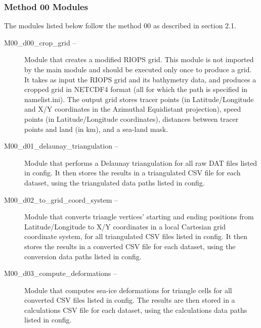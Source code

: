 \documentclass[draft]{agujournal2018}
\begin{document}
\subsubsection{Method 00 Modules}

The modules listed below follow the method 00 as described in section 2.1.

\begin{description}
  \item[M00\_d00\_crop\_grid --]
    Module that creates a modified RIOPS grid. This module is not imported by the main module and should be executed only once to produce a grid. It takes as input the RIOPS grid and its bathymetry data, and produces a cropped grid in NETCDF4 format (all for which the path is specified in namelist.ini). The output grid stores tracer points (in Latitude/Longitude and X/Y coordinates in the Azimuthal Equidistant projection), speed points (in Latitude/Longitude coordinates), distances between tracer points and land (in km), and a sea-land mask.

  \item[M00\_d01\_delaunay\_triangulation --]
    Module that performs a Delaunay triangulation for all raw DAT files listed in config. It then stores the results in a triangulated CSV file for each dataset, using the triangulated data paths listed in config.

  \item[M00\_d02\_to\_grid\_coord\_system --] Module that converts triangle vertices' starting and ending positions from Latitude/Longitude to X/Y coordinates in a local Cartesian grid coordinate system, for all triangulated CSV files listed in config. It then stores the results in a converted CSV file for each dataset, using the conversion data paths listed in config.

   \item[M00\_d03\_compute\_deformations --]
    Module that computes sea-ice deformations for triangle cells for all converted CSV files listed in config. The results are then stored in a calculations CSV file for each dataset, using the calculations data paths listed in config.
\end{description}
\end{document}
